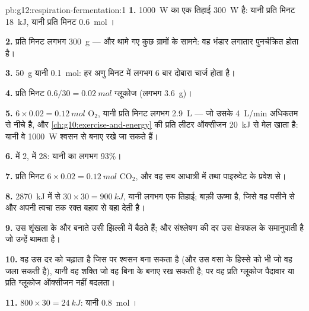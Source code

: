 \begin{solution}{pb:g12:respiration-fermentation:1}
\textbf{1.} \qty{1000}{W} का एक तिहाई \qty{300}{W} है: यानी प्रति मिनट
\qty{18}{kJ}, यानी प्रति मिनट \qty{0.6}{mol} ।

\textbf{2.} प्रति मिनट लगभग \qty{300}{g} --- और थामे गए कुछ ग्रामों के
सामने: वह भंडार लगातार पुनर्चक्रित होता है।

\textbf{3.} \qty{50}{g} यानी \qty{0.1}{mol}: हर अणु मिनट में लगभग 6 बार
दोबारा चार्ज होता है।

\textbf{4.} प्रति मिनट $0.6/30 = \qty{0.02}{mol}$ ग्लूकोज (लगभग
\qty{3.6}{g})।

\textbf{5.} $6 \times 0.02 = \qty{0.12}{mol}$ $\mathrm{O_2}$, यानी प्रति
मिनट लगभग \qty{2.9}{L} --- जो उसके \qty{4}{L/min} अधिकतम से नीचे है, और
\cref{ch:g10:exercise-and-energy} की प्रति लीटर ऑक्सीजन \qty{20}{kJ} से मेल
खाता है: यानी वे \qty{1000}{W} श्वसन से बनाए रखे जा सकते हैं।

\textbf{6.}  में 2,  में 28: यानी  का लगभग 93\%।

\textbf{7.} प्रति मिनट $6 \times 0.02 = \qty{0.12}{mol}$ $\mathrm{CO_2}$,
और वह सब आधात्री में  तथा पाइरुवेट के प्रवेश से।

\textbf{8.} \qty{2870}{kJ} में से $30 \times 30 = \qty{900}{kJ}$, यानी
लगभग एक तिहाई; बाक़ी ऊष्मा है, जिसे वह पसीने से और अपनी त्वचा तक रक्त बहाव
से बहा देती है।

\textbf{9.} उस शृंखला के  और  बनाते  उसी झिल्ली में बैठते
हैं; और  संश्लेषण की दर उस क्षेत्रफल के समानुपाती है जो उन्हें थामता है।

\textbf{10.} वह उस दर को चढ़ाता है जिस पर श्वसन  बना सकता है (और उस वसा
के हिस्से को भी जो वह जला सकती है), यानी वह शक्ति जो वह बिना  के बनाए
रख सकती है; पर वह प्रति ग्लूकोज पैदावार या प्रति ग्लूकोज ऑक्सीजन नहीं बदलता।

\textbf{11.} $800 \times 30 = \qty{24}{kJ}$: यानी \qty{0.8}{mol} ।


\end{solution}

